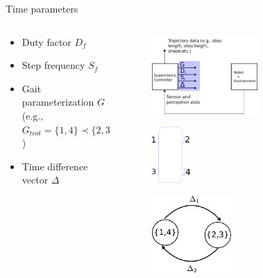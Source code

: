 \documentclass[10pt]{beamer}
\begin{document}
\begin{frame}{Time parameters}
		\begin{columns}
		\hspace{1cm}
		\begin{column}{0.5\textwidth}
		\begin{itemize}
			\setlength\itemsep{3em}
			\item Duty factor $D_f$
			\item Step frequency $S_f$
			\item Gait parameterization $G$ (e.g., $G_{trot}=\{1,4\}\prec\{2,3\}$)
			\item Time difference vector $\Delta$
		\end{itemize}	
		
		\end{column}
		\begin{column}{0.5\textwidth}
			\begin{figure}[ht]\centering
				\includegraphics[width=0.6\textwidth]{images/Supervisoryb.pdf}
			\end{figure}
			\vspace{-0.25cm}\begin{figure}[ht]\centering
							\includegraphics[width=0.22\textwidth]{images/Numbers.pdf}
			\end{figure}
			\begin{figure}[ht]\centering
				\includegraphics[width=0.45\textwidth]{images/TrotTime.pdf}
			\end{figure}
		\end{column}
		\end{columns}
\end{frame}
\end{document}
